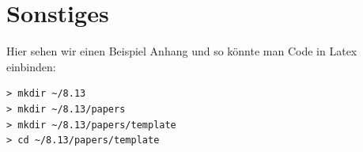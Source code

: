 \documentclass[aps,twocolumn,secnumarabic,nobalancelastpage,amsmath,amssymb,
nofootinbib,superscriptaddress]{revtex4-1}
\begin{document}
\clearpage
\appendix

\section{Sonstiges}
Hier sehen wir einen Beispiel Anhang und so könnte man Code in Latex einbinden:
\begin{verbatim}
> mkdir ~/8.13
> mkdir ~/8.13/papers
> mkdir ~/8.13/papers/template
> cd ~/8.13/papers/template
\end{verbatim}


\end{document}
